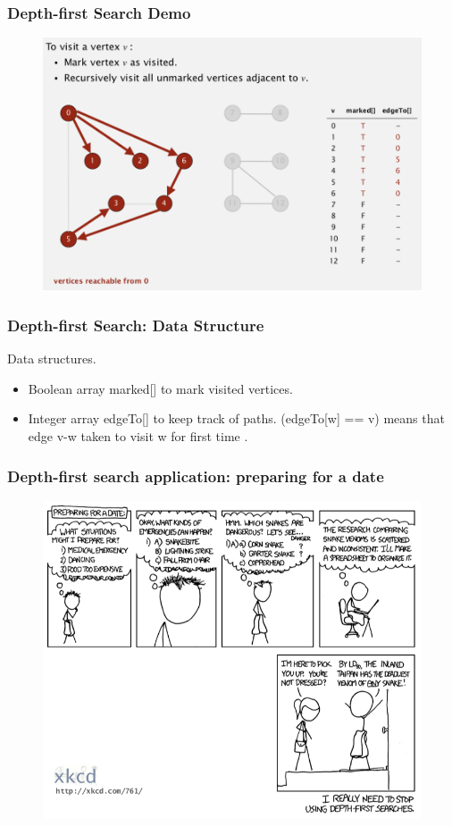\documentclass[11pt]{beamer}
\begin{document}
\begin{frame}
	\frametitle	{Depth-first Search Demo} 
    \begin{figure}
    	\centering
    	\includegraphics[width=1\linewidth]{"Screenshot 2020-12-01 at 6.21.31 AM"}
    	\label{fig:screenshot-2020-12-01-at-6}
    \end{figure}    	
\end{frame}

\begin{frame}
	\frametitle	{Depth-first Search: Data Structure} 
	\alert{Data structures.}
     \begin{itemize}
     	\item Boolean array marked[] to mark visited vertices.
     	\item Integer array edgeTo[] to keep track of paths. (edgeTo[w] == v) means that edge v-w taken to visit w for first time .	
     \end{itemize}
\end{frame}

\begin{frame}
	\frametitle	{Depth-first search application: preparing for a date} 
    \begin{figure}
    	\centering
    	\includegraphics[width=0.9\linewidth]{"Screenshot 2020-12-01 at 6.26.40 AM"}
    	\label{fig:screenshot-2020-12-01-at-6}
    \end{figure}  
\end{frame}
\end{document}
